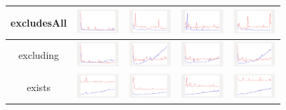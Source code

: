 \begin{longtable}{ c|c c c c}
excludesAll
&
\includegraphics[width=1.6cm]{graphs/sequence/small/ExcludesAll}
&
\includegraphics[width=1.6cm]{graphs/set/small/ExcludesAll}
&
\includegraphics[width=1.6cm]{graphs/bag/small/ExcludesAll}
&
\includegraphics[width=1.6cm]{graphs/orderedset/small/ExcludesAll}
\\\hline

excluding
&
\includegraphics[width=1.6cm]{graphs/sequence/small/Excluding}
&
\includegraphics[width=1.6cm]{graphs/set/small/Excluding}
&
\includegraphics[width=1.6cm]{graphs/bag/small/Excluding}
&
\includegraphics[width=1.6cm]{graphs/orderedset/small/Excluding}
\\\hline

exists
&
\includegraphics[width=1.6cm]{graphs/sequence/small/Exists}
&
\includegraphics[width=1.6cm]{graphs/set/small/Exists}
&
\includegraphics[width=1.6cm]{graphs/bag/small/Exists}
&
\includegraphics[width=1.6cm]{graphs/orderedset/small/Exists}
\\\hline


\end{longtable}
